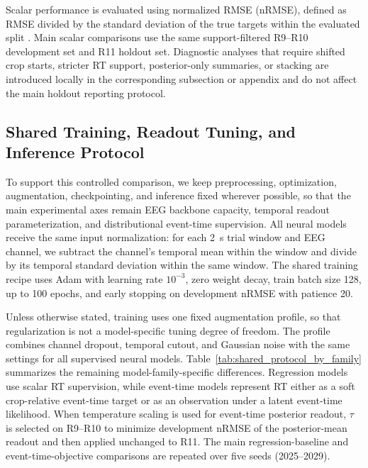 \documentclass[12pt]{article}
\begin{document}
Scalar performance is evaluated using normalized RMSE (nRMSE), defined as RMSE divided by the standard deviation of the true targets within the evaluated split \citep{EEGChallengeWebsite2025}. Main scalar comparisons use the same support-filtered R9--R10 development set and R11 holdout set. Diagnostic analyses that require shifted crop starts, stricter RT support, posterior-only summaries, or stacking are introduced locally in the corresponding subsection or appendix and do not affect the main holdout reporting protocol.

\subsection{Shared Training, Readout Tuning, and Inference Protocol}
\label{sec:shared_protocol}

To support this controlled comparison, we keep preprocessing, optimization, augmentation, checkpointing, and inference fixed wherever possible, so that the main experimental axes remain EEG backbone capacity, temporal readout parameterization, and distributional event-time supervision. All neural models receive the same input normalization: for each 2~s trial window and EEG channel, we subtract the channel's temporal mean within the window and divide by its temporal standard deviation within the same window. The shared training recipe uses Adam with learning rate \(10^{-3}\), zero weight decay, train batch size 128, up to 100 epochs, and early stopping on development nRMSE with patience 20.

Unless otherwise stated, training uses one fixed augmentation profile, so that regularization is not a model-specific tuning degree of freedom. The profile combines channel dropout, temporal cutout, and Gaussian noise with the same settings for all supervised neural models. Table~\ref{tab:shared_protocol_by_family} summarizes the remaining model-family-specific differences. Regression models use scalar RT supervision, while event-time models represent RT either as a soft crop-relative event-time target or as an observation under a latent event-time likelihood. When temperature scaling is used for event-time posterior readout, \(\tau\) is selected on R9--R10 to minimize development nRMSE of the posterior-mean readout and then applied unchanged to R11. The main regression-baseline and event-time-objective comparisons are repeated over five seeds (2025--2029).
\end{document}
